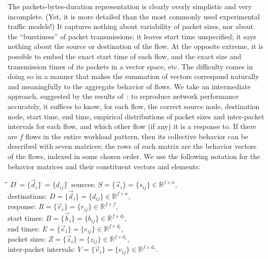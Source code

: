 \documentclass[conference]{IEEEtran}
\newcommand{\R}{\mathbb{R}}
\newcommand{\setx}[1]{\{#1\}}
\renewcommand{\bullet}{\raisebox{2pt}{$\centerdot$}}
\begin{document}
The {packets-bytes-duration} representation is clearly overly simplistic and very incomplete. (Yet, it is more detailed than the most commonly used experimental traffic models!) It captures nothing about variability of packet sizes, nor about the ``burstiness'' of packet transmissions; it leaves start time unspecified; it says nothing about the source or destination of the flow. At the opposite extreme, it is possible to embed the exact start time of each flow, and the exact size and transmission times of its packets in a vector space, etc. The difficulty comes in doing so in a manner that makes the summation of vectors correspond naturally and meaningfully to the aggregate behavior of flows. We take an intermediate approach, suggested by the results of~\cite{Karpinski07:realism}: to reproduce network performance accurately, it suffices to know, for each flow, the correct source node, destination node, start time, end time, empirical distributions of packet sizes and inter-packet intervals for each flow, and which other flow (if any) it is a response to. If there are $f$ flows in the entire workload pattern, then its collective behavior can be described with seven matrices; the rows of each matrix are the behavior vectors of the flows, indexed in some chosen order. We use the following notation for the behavior matrices and their constituent vectors and elements:\vspace{-0.25em}
\begin{tabbing}
\hspace{1.5em}\=\bullet\hspace{0.5em}\=\hspace{9.75em}\=
$D\:$\=$=\setx{\vec{d}_i}\:$\=$=\setx{d_{ij}}\:$\=\kill
\>\bullet\> sources: \>$S$\>$=\setx{\vec{s}_i}$\>$=\setx{s_{ij}}$\>$\in\R^{f \times n}$,\\
\>\bullet\> destinations: \>$D$\>$=\setx{\vec{d}_i}$\>$=\setx{d_{ij}}$\>$\in\R^{f \times n}$,\\
\>\bullet\> response: \>$R$\>$=\setx{\vec{r}_i}$\>$=\setx{r_{ij}}$\>$\in\R^{f \times f}$,\\
\>\bullet\> start times: \>$B$\>$=\setx{\vec{b}_i}$\>$=\setx{b_{ij}}$\>$\in\R^{f \times d_t}$,\\
\>\bullet\> end times: \>$E$\>$=\setx{\vec{e}_i}$\>$=\setx{e_{ij}}$\>$\in\R^{f \times d_t}$,\\
\>\bullet\> packet sizes: \>$Z$\>$=\setx{\vec{z}_i}$\>$=\setx{z_{ij}}$\>$\in\R^{f \times d_z}$,\\
\>\bullet\> inter-packet intervals: \>$V$\>$=\setx{\vec{v}_i}$\>$=\setx{v_{ij}}$\>$\in\R^{f \times d_v}$.
\end{tabbing}
\end{document}
